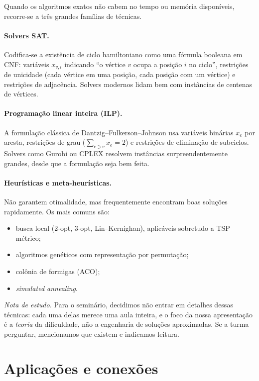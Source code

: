 \documentclass[11pt,a4paper]{article}
\theoremstyle{definition}
\newcommand{\nota}[1]{%
  \par\medskip
  {\small\color{notagray}\textit{Nota de estudo.} #1}\par\medskip
}
\begin{document}
Quando os algoritmos exatos não cabem no tempo ou memória disponíveis, recorre-se a três grandes famílias de técnicas.

\paragraph{Solvers SAT.} Codifica-se a existência de ciclo hamiltoniano como uma fórmula booleana em CNF: variáveis $x_{v,i}$ indicando ``o vértice $v$ ocupa a posição $i$ no ciclo'', restrições de unicidade (cada vértice em uma posição, cada posição com um vértice) e restrições de adjacência. Solvers modernos lidam bem com instâncias de centenas de vértices.

\paragraph{Programação linear inteira (ILP).} A formulação clássica de Dantzig--Fulkerson--Johnson usa variáveis binárias $x_e$ por aresta, restrições de grau ($\sum_{e \ni v} x_e = 2$) e restrições de eliminação de subciclos. Solvers como Gurobi ou CPLEX resolvem instâncias surpreendentemente grandes, desde que a formulação seja bem feita.

\paragraph{Heurísticas e meta-heurísticas.} Não garantem otimalidade, mas frequentemente encontram boas soluções rapidamente. Os mais comuns são:
\begin{itemize}[leftmargin=*]
  \item busca local (2-opt, 3-opt, Lin--Kernighan), aplicáveis sobretudo a TSP métrico;
  \item algoritmos genéticos com representação por permutação;
  \item colônia de formigas (ACO);
  \item \emph{simulated annealing}.
\end{itemize}

\nota{Para o seminário, decidimos não entrar em detalhes dessas técnicas: cada uma delas merece uma aula inteira, e o foco da nossa apresentação é a \emph{teoria} da dificuldade, não a engenharia de soluções aproximadas. Se a turma perguntar, mencionamos que existem e indicamos leitura.}

\section{Aplicações e conexões}
\end{document}

